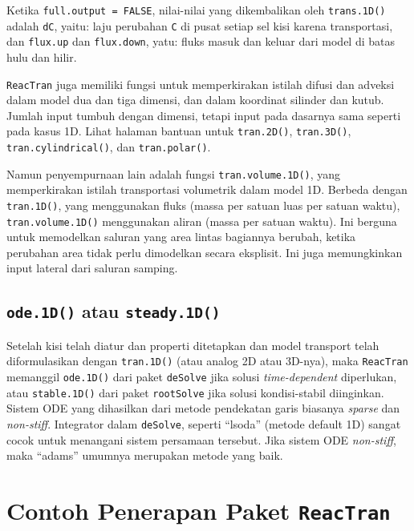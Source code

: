 \documentclass[
]{book}
\theoremstyle{definition}
\theoremstyle{definition}
\theoremstyle{definition}
\theoremstyle{definition}
\theoremstyle{remark}
\begin{document}
Ketika \texttt{full.output\ =\ FALSE}, nilai-nilai yang dikembalikan oleh \texttt{trans.1D()} adalah \texttt{dC}, yaitu: laju perubahan \texttt{C} di pusat setiap sel kisi karena transportasi, dan \texttt{flux.up} dan \texttt{flux.down}, yatu: fluks masuk dan keluar dari model di batas hulu dan hilir.

\texttt{ReacTran} juga memiliki fungsi untuk memperkirakan istilah difusi dan adveksi dalam model dua dan tiga dimensi, dan dalam koordinat silinder dan kutub. Jumlah input tumbuh dengan dimensi, tetapi input pada dasarnya sama seperti pada kasus 1D. Lihat halaman bantuan untuk \texttt{tran.2D()}, \texttt{tran.3D()}, \texttt{tran.cylindrical()}, dan \texttt{tran.polar()}.

Namun penyempurnaan lain adalah fungsi \texttt{tran.volume.1D()}, yang memperkirakan istilah transportasi volumetrik dalam model 1D. Berbeda dengan \texttt{tran.1D()}, yang menggunakan fluks (massa per satuan luas per satuan waktu), \texttt{tran.volume.1D()} menggunakan aliran (massa per satuan waktu). Ini berguna untuk memodelkan saluran yang area lintas bagiannya berubah, ketika perubahan area tidak perlu dimodelkan secara eksplisit. Ini juga memungkinkan input lateral dari saluran samping.

\hypertarget{ode.1d-atau-steady.1d}{%
\subsection{\texorpdfstring{\texttt{ode.1D()} atau \texttt{steady.1D()}}{ode.1D() atau steady.1D()}}\label{ode.1d-atau-steady.1d}}

Setelah kisi telah diatur dan properti ditetapkan dan model transport telah diformulasikan dengan \texttt{tran.1D()} (atau analog 2D atau 3D-nya), maka \texttt{ReacTran} memanggil \texttt{ode.1D()} dari paket \texttt{deSolve} jika solusi \emph{time-dependent} diperlukan, atau \texttt{stable.1D()} dari paket \texttt{rootSolve} jika solusi kondisi-stabil diinginkan. Sistem ODE yang dihasilkan dari metode pendekatan garis biasanya \emph{sparse} dan \emph{non-stiff}. Integrator dalam \texttt{deSolve}, seperti ``lsoda'' (metode default 1D) sangat cocok untuk menangani sistem persamaan tersebut. Jika sistem ODE \emph{non-stiff}, maka ``adams'' umumnya merupakan metode yang baik.

\hypertarget{contoh-penerapan-paket-reactran}{%
\section{\texorpdfstring{Contoh Penerapan Paket \texttt{ReacTran}}{Contoh Penerapan Paket ReacTran}}\label{contoh-penerapan-paket-reactran}}
\end{document}
